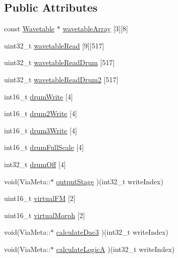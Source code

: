 \subsection*{Public Attributes}
\begin{DoxyCompactItemize}
\item 
const \mbox{\hyperlink{struct_wavetable}{Wavetable}} $\ast$ \mbox{\hyperlink{class_via_meta_a62891dea61827785487b4b8f2ada5641}{wavetable\+Array}} \mbox{[}3\mbox{]}\mbox{[}8\mbox{]}
\item 
uint32\+\_\+t \mbox{\hyperlink{class_via_meta_aedee75e7f255d70c7292972d5e5eef65}{wavetable\+Read}} \mbox{[}9\mbox{]}\mbox{[}517\mbox{]}
\item 
uint32\+\_\+t \mbox{\hyperlink{class_via_meta_a8b0b6f0072b72144fe3f894b6303a0d4}{wavetable\+Read\+Drum}} \mbox{[}517\mbox{]}
\item 
uint32\+\_\+t \mbox{\hyperlink{class_via_meta_aceb676011c9259d33d690fe1101421a4}{wavetable\+Read\+Drum2}} \mbox{[}517\mbox{]}
\item 
int16\+\_\+t \mbox{\hyperlink{class_via_meta_a2650520c89c5e41f90571a6670cc3786}{drum\+Write}} \mbox{[}4\mbox{]}
\item 
int16\+\_\+t \mbox{\hyperlink{class_via_meta_a99391f3254d8e106fc7d1d7b3422b1b1}{drum2\+Write}} \mbox{[}4\mbox{]}
\item 
int16\+\_\+t \mbox{\hyperlink{class_via_meta_abe228d0883cfa64c5c34368270dce045}{drum3\+Write}} \mbox{[}4\mbox{]}
\item 
int16\+\_\+t \mbox{\hyperlink{class_via_meta_af67df1f1a9de4ee090de75709c9e8445}{drum\+Full\+Scale}} \mbox{[}4\mbox{]}
\item 
int32\+\_\+t \mbox{\hyperlink{class_via_meta_ac0e88a37fdb70516c048a65c0195925b}{drum\+Off}} \mbox{[}4\mbox{]}
\item 
void(Via\+Meta\+::$\ast$ \mbox{\hyperlink{class_via_meta_ab0b9e808d133a9bc00bca8ecc5928b87}{output\+Stage}} )(int32\+\_\+t write\+Index)
\item 
uint16\+\_\+t \mbox{\hyperlink{class_via_meta_a3a04782d64b83dd605cab1e67742d476}{virtual\+FM}} \mbox{[}2\mbox{]}
\item 
uint16\+\_\+t \mbox{\hyperlink{class_via_meta_a8915cefaa524a38f30f7d80a3f61f69b}{virtual\+Morph}} \mbox{[}2\mbox{]}
\item 
void(Via\+Meta\+::$\ast$ \mbox{\hyperlink{class_via_meta_a20f99319d993114f391102f7cadd558d}{calculate\+Dac3}} )(int32\+\_\+t write\+Index)
\item 
void(Via\+Meta\+::$\ast$ \mbox{\hyperlink{class_via_meta_a5dabe309f8cc5990a11eb2eb5fb7d872}{calculate\+LogicA}} )(int32\+\_\+t write\+Index)

\end{DoxyCompactItemize}

